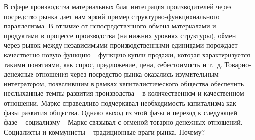 \documentclass{book}
\begin{document}
В сфере производства материальных благ интеграция произ­водителей через посредство рынка  дает нам яркий пример струк­турно-функционального параллелизма. В отличие от непосред­ственного обмена материалами и продуктами в процессе производства (на нижних уровнях структуры), обмен через рынок между независимыми производственными единицами порож­дает качественно новую функцию -- функцию купли-продажи, которая характеризуется такими понятиями, как спрос, предло­жение, цена, себестоимость и т.~д. Товарно-денежные отношения через посредство рынка оказались изумительным интегратором, позволившим в рамках капиталистического общества обеспе­чить неслыханные темпы развития производства -- в количест­венном и качественном отношении. Маркс справедливо под­черкивал необходимость капитализма как фазы развития об­щества. Однако выход из этой фазы и переход к следующей фазе -- социализму -- Маркс связывал с отменой товарно-де­нежных отношений. Социалисты и коммунисты -- традицион­ные враги рынка. Почему?
\end{document}
